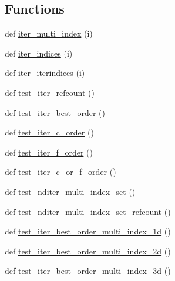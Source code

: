 \subsection*{Functions}
\begin{DoxyCompactItemize}
\item 
def \hyperlink{namespacenumpy_1_1core_1_1tests_1_1test__nditer_ab06722596c12535043383efa6ec446a0}{iter\+\_\+multi\+\_\+index} (i)
\item 
def \hyperlink{namespacenumpy_1_1core_1_1tests_1_1test__nditer_a04f093610e259e917be7bfb704ca7d3e}{iter\+\_\+indices} (i)
\item 
def \hyperlink{namespacenumpy_1_1core_1_1tests_1_1test__nditer_aace0e825457d7f5c52d77f8cf358f90d}{iter\+\_\+iterindices} (i)
\item 
def \hyperlink{namespacenumpy_1_1core_1_1tests_1_1test__nditer_a5d83fa2a2ca75c653ffb2164ebeb6c8b}{test\+\_\+iter\+\_\+refcount} ()
\item 
def \hyperlink{namespacenumpy_1_1core_1_1tests_1_1test__nditer_ad2a2ba5d403ac69dde3b9f67b9ff6319}{test\+\_\+iter\+\_\+best\+\_\+order} ()
\item 
def \hyperlink{namespacenumpy_1_1core_1_1tests_1_1test__nditer_a89dacf0a0151ad8a97a98696ddd01ca0}{test\+\_\+iter\+\_\+c\+\_\+order} ()
\item 
def \hyperlink{namespacenumpy_1_1core_1_1tests_1_1test__nditer_a4ccfb97b4031f11586620ffcee4aa339}{test\+\_\+iter\+\_\+f\+\_\+order} ()
\item 
def \hyperlink{namespacenumpy_1_1core_1_1tests_1_1test__nditer_acb6dc3136a0d5d4f605f9a54bcf0cbd6}{test\+\_\+iter\+\_\+c\+\_\+or\+\_\+f\+\_\+order} ()
\item 
def \hyperlink{namespacenumpy_1_1core_1_1tests_1_1test__nditer_afe3bd5bc7d76932bd07fd0c5cfaaf14d}{test\+\_\+nditer\+\_\+multi\+\_\+index\+\_\+set} ()
\item 
def \hyperlink{namespacenumpy_1_1core_1_1tests_1_1test__nditer_a66aa21ce2f50a4e25a1726bf15a4ecae}{test\+\_\+nditer\+\_\+multi\+\_\+index\+\_\+set\+\_\+refcount} ()
\item 
def \hyperlink{namespacenumpy_1_1core_1_1tests_1_1test__nditer_ae8f48b5bb4db661fd720c01a623d9690}{test\+\_\+iter\+\_\+best\+\_\+order\+\_\+multi\+\_\+index\+\_\+1d} ()
\item 
def \hyperlink{namespacenumpy_1_1core_1_1tests_1_1test__nditer_a40b47878329229f9bfdfc9efaeabe170}{test\+\_\+iter\+\_\+best\+\_\+order\+\_\+multi\+\_\+index\+\_\+2d} ()
\item 
def \hyperlink{namespacenumpy_1_1core_1_1tests_1_1test__nditer_acd6d95207112af7a4b50f822d78b4c2b}{test\+\_\+iter\+\_\+best\+\_\+order\+\_\+multi\+\_\+index\+\_\+3d} ()

\end{DoxyCompactItemize}
